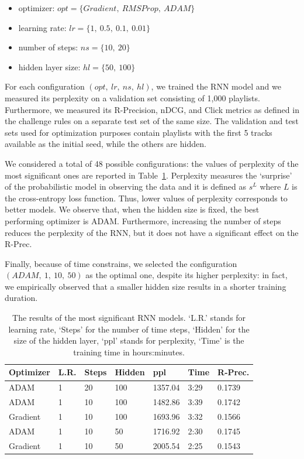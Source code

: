 \begin{itemize}
\item optimizer: $opt = \{Gradient,\ RMSProp,\ ADAM\}$
\item learning rate: $lr = \{1,\ 0.5,\ 0.1,\ 0.01\}$
\item number of steps: $ns = \{10,\ 20\}$
\item hidden layer size: $hl = \{50,\ 100\}$ 
\end{itemize}

For each configuration $(opt,\ lr,\ ns,\ hl)$, we trained the RNN model and we measured its perplexity on a validation set consisting of 1,000 playlists. Furthermore, we measured its R-Precision, nDCG, and Click metrics as defined in the challenge rules on a separate test set of the same size. The validation and test sets used for optimization purposes contain playlists with the first 5 tracks available as the initial seed, while the others are hidden.

We considered a total of 48 possible configurations: the values of perplexity of the most significant ones are reported in Table~\ref{rnn:tab:rnn_opt}. Perplexity measures the `surprise' of the probabilistic model in observing the data and it is defined as $s^{L}$ where $L$ is the cross-entropy loss function. Thus, lower values of perplexity corresponds to better models. We observe that, when the hidden size is fixed, the best performing optimizer is ADAM. Furthermore, increasing the number of steps reduces the perplexity of the RNN, but it does not have a significant effect on the R-Prec.

Finally, because of time constrains, we selected the configuration $(ADAM,\allowbreak\ 1,\allowbreak\ 10,\allowbreak\ 50)$ as the optimal one, despite its higher perplexity: in fact, we empirically observed that a smaller hidden size results in a shorter training duration.

\begin{table}
\centering
\begin{tabular}{@{}lllllll@{}}
\toprule
Optimizer & L.R. & Steps & Hidden  & ppl     & Time & R-Prec. \\ \midrule
ADAM      & 1    & 20    & 100     & 1357.04 & 3:29 & 0.1739  \\
ADAM      & 1    & 10    & 100     & 1482.86 & 3:39 & 0.1742  \\
Gradient  & 1    & 10    & 100     & 1693.96 & 3:32 & 0.1566  \\
ADAM      & 1    & 10    & 50      & 1716.92 & 2:30 & 0.1745  \\
Gradient  & 1    & 10    & 50      & 2005.54 & 2:25 & 0.1543  \\ \bottomrule
\end{tabular}
\caption[Results of the RNN models]{The results of the most significant RNN models. `L.R.' stands for learning rate, `Steps' for the number of time steps, `Hidden' for the size of the hidden layer, `ppl' stands for perplexity, `Time' is the training time in hours:minutes.}
\label{rnn:tab:rnn_opt}
\end{table}

